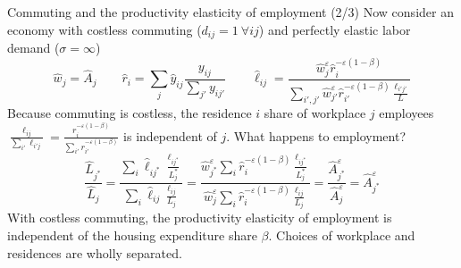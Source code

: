 \documentclass[11pt,notes=hide,aspectratio=169]{beamer}
\begin{document}
\begin{frame}{Commuting and the productivity elasticity of employment (2/3)}
Now consider an economy with costless commuting ($d_{ij} = 1 \ \forall ij$) and perfectly elastic labor demand ($\sigma = \infty$)
\begin{equation*}
\hat{w}_{j}
=
\hat{A}_j
\qquad
\hat{r}_{i}
=
\sum_{j}\hat{y}_{ij}\frac{y_{ij}}{\sum_{j'}y_{ij'}}
\qquad
\hat{\ell}_{ij} 
=
\frac{\hat{w}_{j}^{\varepsilon}\hat{r}_{i}^{-\varepsilon(1-\beta)}}{\sum_{i',j'} \hat{w}_{j'}^{\varepsilon}\hat{r}_{i'}^{-\varepsilon(1-\beta)} \frac{\ell_{i'j'}}{L}}
\end{equation*}
Because commuting is costless,
the residence $i$ share of workplace $j$ employees
$\frac{\ell_{ij}}{\sum_{i'} \ell_{i'j}} = \frac{r_{i}^{-\varepsilon(1-\beta)}}{\sum_{i'} r_{i'}^{-\varepsilon(1-\beta)}}$
is independent of $j$.
What happens to employment?
$$
\frac{\hat{L}_{j^{*}}}{\hat{L}_{j}}
=
\frac{\sum_{i}\hat{\ell}_{ij^{*}} \frac{\ell_{ij^{*}}}{L_j^{*}}}{\sum_{i}\hat{\ell}_{ij} \frac{\ell_{ij}}{L_j}}
=
\frac{\hat{w}_{j^{*}}^{\varepsilon} \sum_{i} \hat{r}_{i}^{-\varepsilon(1-\beta)} \frac{\ell_{ij^{*}}}{L_j^{*}}}{\hat{w}_{j}^{\varepsilon} \sum_{i} \hat{r}_{i}^{-\varepsilon(1-\beta)} \frac{\ell_{ij}}{L_j}}
=
\frac{\hat{A}_{j^{*}}^{\varepsilon}}{\hat{A}_{j}^{\varepsilon}}
=
\hat{A}_{j^{*}}^{\varepsilon}
$$
With costless commuting, the productivity elasticity of employment is independent of the housing expenditure share $\beta$.
Choices of workplace and residences are wholly separated.
\end{frame}
\end{document}
